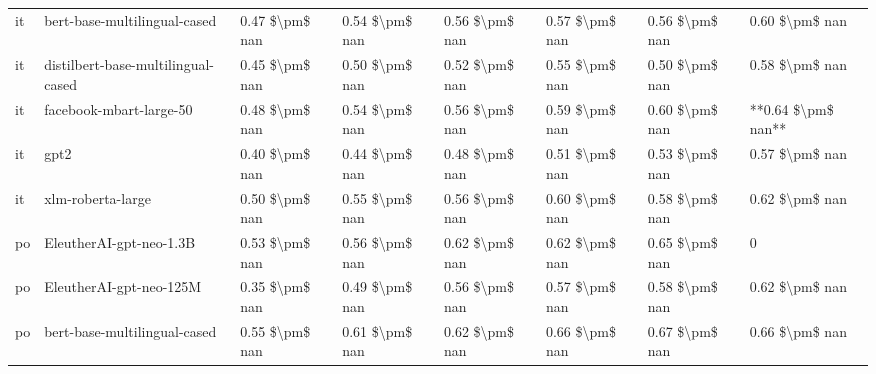 \begin{tabular}{llllllll}
      it &       bert-base-multilingual-cased & 0.47 \$\textbackslash pm\$ nan &            0.54 \$\textbackslash pm\$ nan &        0.56 \$\textbackslash pm\$ nan &         0.57 \$\textbackslash pm\$ nan &                          0.56 \$\textbackslash pm\$ nan &     0.60 \$\textbackslash pm\$ nan \\
      it & distilbert-base-multilingual-cased & 0.45 \$\textbackslash pm\$ nan &            0.50 \$\textbackslash pm\$ nan &        0.52 \$\textbackslash pm\$ nan &         0.55 \$\textbackslash pm\$ nan &                          0.50 \$\textbackslash pm\$ nan &     0.58 \$\textbackslash pm\$ nan \\
      it &            facebook-mbart-large-50 & 0.48 \$\textbackslash pm\$ nan &            0.54 \$\textbackslash pm\$ nan &        0.56 \$\textbackslash pm\$ nan &         0.59 \$\textbackslash pm\$ nan &                          0.60 \$\textbackslash pm\$ nan & **0.64 \$\textbackslash pm\$ nan** \\
      it &                               gpt2 & 0.40 \$\textbackslash pm\$ nan &            0.44 \$\textbackslash pm\$ nan &        0.48 \$\textbackslash pm\$ nan &         0.51 \$\textbackslash pm\$ nan &                          0.53 \$\textbackslash pm\$ nan &     0.57 \$\textbackslash pm\$ nan \\
      it &                  xlm-roberta-large & 0.50 \$\textbackslash pm\$ nan &            0.55 \$\textbackslash pm\$ nan &        0.56 \$\textbackslash pm\$ nan &         0.60 \$\textbackslash pm\$ nan &                          0.58 \$\textbackslash pm\$ nan &     0.62 \$\textbackslash pm\$ nan \\
      po &            EleutherAI-gpt-neo-1.3B & 0.53 \$\textbackslash pm\$ nan &            0.56 \$\textbackslash pm\$ nan &        0.62 \$\textbackslash pm\$ nan &         0.62 \$\textbackslash pm\$ nan &                          0.65 \$\textbackslash pm\$ nan &                  0 \\
      po &            EleutherAI-gpt-neo-125M & 0.35 \$\textbackslash pm\$ nan &            0.49 \$\textbackslash pm\$ nan &        0.56 \$\textbackslash pm\$ nan &         0.57 \$\textbackslash pm\$ nan &                          0.58 \$\textbackslash pm\$ nan &     0.62 \$\textbackslash pm\$ nan \\
      po &       bert-base-multilingual-cased & 0.55 \$\textbackslash pm\$ nan &            0.61 \$\textbackslash pm\$ nan &        0.62 \$\textbackslash pm\$ nan &         0.66 \$\textbackslash pm\$ nan &                          0.67 \$\textbackslash pm\$ nan &     0.66 \$\textbackslash pm\$ nan \\

\end{tabular}
